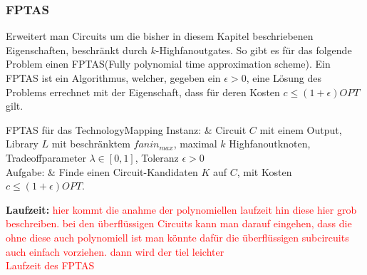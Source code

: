 \documentclass[11pt, a4paper, german]{article}
\newcommand{\TM}{TechnologyMapping }
\begin{document}
\subsubsection{FPTAS}
\label{subsubsec:fptas}
Erweitert man Circuits um die bisher in diesem Kapitel beschriebenen Eigenschaften, beschränkt durch $k$-Highfanoutgates. So gibt es für das folgende Problem einen FPTAS(Fully polynomial time approximation scheme). Ein FPTAS ist ein Algorithmus, welcher, gegeben ein $\epsilon > 0$, eine Lösung des Problems errechnet mit der Eigenschaft, dass für deren Kosten $c \leq (1+\epsilon)OPT$ gilt. \\
 \begin{problem}[framed]{FPTAS für das \TM}
  Instanz:  & Circuit $C$ mit einem Output, Library $L$ mit beschr\"anktem $fanin_{max}$, maximal $k$ Highfanoutknoten, Tradeoffparameter $\lambda \in [0,1]$, Toleranz $\epsilon > 0$ \\
  Aufgabe: &  Finde einen Circuit-Kandidaten $K$ auf $C$, mit Kosten $c \leq (1+\epsilon)OPT$.
\end{problem}
{\bf Laufzeit: }
\textcolor{red}{hier kommt die anahme der polynomiellen laufzeit hin diese hier grob beschreiben. bei den überflüssigen Circuits kann man darauf eingehen, dass die ohne diese auch polynomiell ist man könnte dafür die überflüssigen subcircuits auch einfach vorziehen. dann wird der tiel leichter}\\
\textcolor{red}{Laufzeit des FPTAS}
\end{document}
